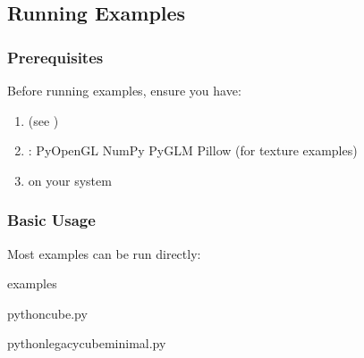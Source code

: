 \documentclass[a4paper,10pt,english,openany,oneside]{sphinxmanual}
\begin{document}
\subsection{Running Examples}
\label{\detokenize{examples:running-examples}}

\subsubsection{Prerequisites}
\label{\detokenize{examples:prerequisites}}
\sphinxAtStartPar
Before running examples, ensure you have:
\begin{enumerate}
%
\item {} 
\sphinxAtStartPar
{} (see {\hyperref[\detokenize{installation::doc}]{}})

\item {} 
\sphinxAtStartPar
{}:
\sphinxhyphen{} PyOpenGL
\sphinxhyphen{} NumPy
\sphinxhyphen{} PyGLM
\sphinxhyphen{} Pillow (for texture examples)

\item {} 
\sphinxAtStartPar
{} on your system

\end{enumerate}


\subsubsection{Basic Usage}
\label{\detokenize{examples:basic-usage}}
\sphinxAtStartPar
Most examples can be run directly:

\begin{sphinxVerbatim}[commandchars=\\\{\}]
examples

pythoncube.py

pythonlegacy\PYGZus{}cube\PYGZus{}minimal.py
\end{sphinxVerbatim}
\end{document}
